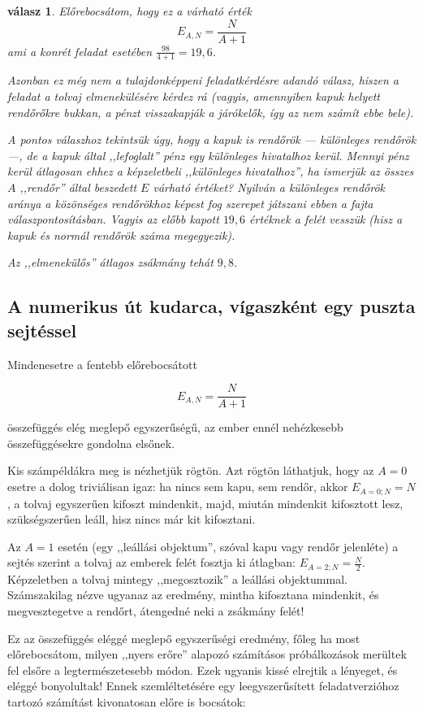 \documentclass{article}
\newtheorem{answer}{válasz}
\begin{document}
	\begin{answer}
		Előrebocsátom, hogy ez a várható érték
		\[
			E_{A,N} = \frac N{A+1}
		\]
		ami a konrét feladat esetében $\frac{98}{4+1} = 19,6$.

		Azonban ez még nem a tulajdonképpeni feladatkérdésre adandó válasz, hiszen a feladat a tolvaj elmenekülésére kérdez rá (vagyis, amennyiben kapuk helyett rendőrőkre bukkan, a pénzt visszakapják a járókelők, így az nem számít ebbe bele).

		A pontos válaszhoz tekintsük úgy, hogy a kapuk is rendőrök --- különleges rendőrök ---, de a kapuk által ,,lefoglalt'' pénz egy különleges hivatalhoz kerül. Mennyi pénz kerül átlagosan ehhez a képzeletbeli ,,különleges hivatalhoz'', ha ismerjük az összes $A$ ,,rendőr'' által beszedett $E$ várható értéket? Nyilván a különleges rendőrök aránya a közönséges rendőrökhoz képest fog szerepet játszani ebben a fajta válaszpontosításban. Vagyis az előbb kapott $19,6$ értéknek a felét vesszük (hisz a kapuk és normál rendőrök száma megegyezik).

		Az ,,elmenekülős'' átlagos zsákmány tehát $9,8$. 
	\end{answer}

	\subsection{A numerikus út kudarca, vígaszként egy puszta sejtéssel}

	Mindenesetre a fentebb előrebocsátott

	\[
		E_{A,N} = \frac N{A+1}
	\]

	összefüggés elég meglepő egyszerűségű, az ember ennél nehézkesebb összefüggésekre gondolna elsőnek.

	Kis számpéldákra meg is nézhetjük rögtön.
	Azt rögtön láthatjuk, hogy az $A=0$ esetre a dolog triviálisan igaz: ha nincs sem kapu, sem rendőr, akkor $E_{A=0;N} = N$, a tolvaj egyszerűen kifoszt mindenkit, majd, miután mindenkit kifosztott lesz, szükségszerűen leáll, hisz nincs már kit kifosztani.

	Az $A=1$ esetén (egy ,,leállási objektum'', szóval kapu vagy rendőr jelenléte) a sejtés szerint a tolvaj az emberek felét fosztja ki átlagban: $E_{A=2;N} = \frac N2$. Képzeletben a tolvaj mintegy ,,megosztozik'' a leállási objektummal. Számszakilag nézve ugyanaz az eredmény, mintha kifosztana mindenkit, és megvesztegetve a rendőrt, átengedné neki a zsákmány felét!

	Ez az összefüggés eléggé meglepő egyszerűségi eredmény, főleg ha most előrebocsátom, milyen ,,nyers erőre'' alapozó számításos próbálkozások merültek fel elsőre a legtermészetesebb módon.
	Ezek ugyanis kissé elrejtik a lényeget, és eléggé bonyolultak!
	Ennek szemléltetésére egy leegyszerűsített feladatverzióhoz tartozó számítást kivonatosan előre is bocsátok:
\end{document}
